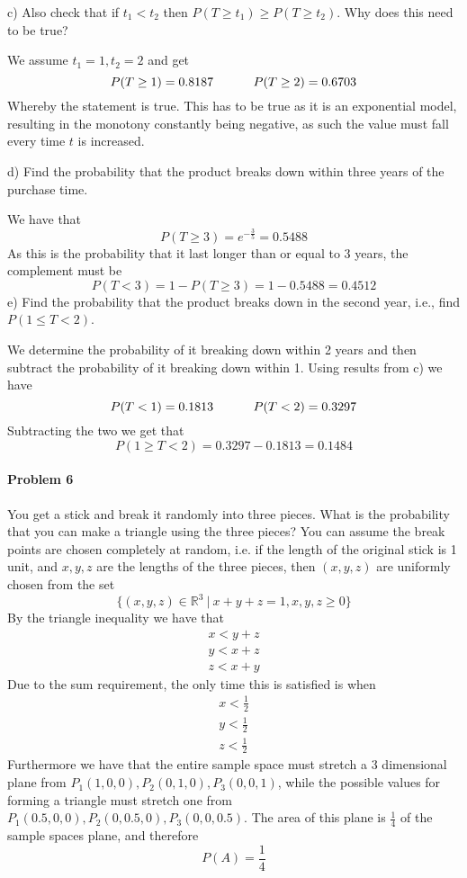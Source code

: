 c) Also check that if $t_{1}<t_{2}$ then $P(T\geq t_{1})\geq P(T\geq t_{2})$. Why does this need to be true?

We assume $t_{1}=1,t_{2}=2$ and get
\[
    P(T\geq 1)=0.8187\hskip 32pt P(T\geq 2)=0.6703
\]
Whereby the statement is true. This has to be true as it is an exponential model, resulting in the monotony constantly being negative, as such the value must fall every time $t$ is increased.

d) Find the probability that the product breaks down within three years of the purchase time.

We have that
\[
    P(T\geq 3)=e^{-\frac{3}{5}}=0.5488
\]
As this is the probability that it last longer than or equal to 3 years, the complement must be
\[
    P(T<3)=1-P(T\geq 3)=1-0.5488=0.4512
\]
e) Find the probability that the product breaks down in the second year, i.e., find $P(1\leq T<2)$.

We determine the probability of it breaking down within 2 years and then subtract the probability of it breaking down within 1. Using results from c) we have
\[
    P(T<1)=0.1813\hskip 32pt P(T<2)=0.3297
\]
Subtracting the two we get that
\[
    P(1\geq T<2)=0.3297-0.1813=0.1484
\]
\paragraph{Problem 6}
You get a stick and break it randomly into three pieces. What is the probability that you can make a triangle using the three pieces? You can assume the break points are chosen completely at random, i.e. if the length of the original stick is 1 unit, and $x,y,z$ are the lengths of the three pieces, then $(x,y,z)$ are uniformly chosen from the set
\[
    \{(x,y,z)\in \mathbb{R}^{3}~|~x+y+z=1,x,y,z\geq 0\}
\]
By the triangle inequality we have that
\begin{align*}
  x<y+z \\
  y<x+z \\
  z<x+y
\end{align*}
Due to the sum requirement, the only time this is satisfied is when
\begin{align*}
  x<\frac{1}{2} \\
  y<\frac{1}{2} \\
  z<\frac{1}{2}
\end{align*}
Furthermore we have that the entire sample space must stretch a 3 dimensional plane from $P_{1}(1,0,0),P_{2}(0,1,0),P_{3}(0,0,1)$, while the possible values for forming a triangle must stretch one from $P_{1}(0.5,0,0),P_{2}(0,0.5,0),P_{3}(0,0,0.5).$ The area of this plane is $\frac{1}{4}$ of the sample spaces plane, and therefore
\[
    P(A)=\frac{1}{4}
\]
